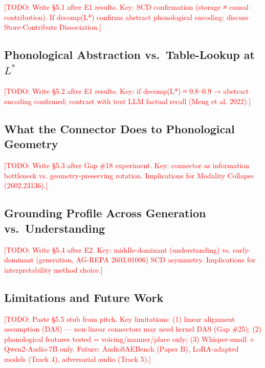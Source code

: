 \documentclass{article}
\newcommand{\Lstar}{L^*}
\newcommand{\todo}[1]{\textcolor{red}{[TODO: #1]}}
\begin{document}
\todo{Write §5.1 after E1 results. Key: SCD confirmation (storage ≠ causal contribution).
  If decomp(L*) confirms abstract phonological encoding: discuss Store-Contribute Dissociation.}

\subsection{Phonological Abstraction vs.\ Table-Lookup at $\Lstar$}
\label{sec:disc_abstraction}

\todo{Write §5.2 after E1 results. Key: if decomp(L*) ≈ 0.8–0.9 → abstract encoding confirmed;
  contrast with text LLM factual recall (Meng et al. 2022).}

\subsection{What the Connector Does to Phonological Geometry}
\label{sec:disc_connector}

\todo{Write §5.3 after Gap \#18 experiment. Key: connector as information bottleneck
  vs. geometry-preserving rotation. Implications for Modality Collapse (2602.23136).}

\subsection{Grounding Profile Across Generation vs.\ Understanding}
\label{sec:disc_gen_vs_under}

\todo{Write §5.4 after E2. Key: middle-dominant (understanding) vs. early-dominant (generation,
  AG-REPA 2603.01006) SCD asymmetry. Implications for interpretability method choice.}

\subsection{Limitations and Future Work}
\label{sec:limitations}

\todo{Paste §5.5 stub from pitch. Key limitations:
  (1) linear alignment assumption (DAS) — non-linear connectors may need kernel DAS (Gap \#25);
  (2) phonological features tested = voicing/manner/place only;
  (3) Whisper-small + Qwen2-Audio-7B only.
  Future: AudioSAEBench (Paper B), LoRA-adapted models (Track 4), adversarial audio (Track 5).}
\end{document}
